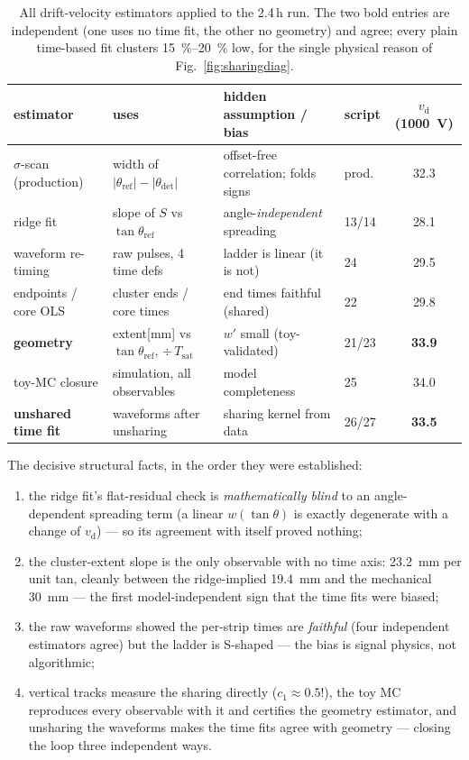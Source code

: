\documentclass[11pt,a4paper]{article}
\newcommand{\vd}{v_{\mathrm{d}}}
\newcommand{\thref}{\theta_{\mathrm{ref}}}
\newcommand{\thdet}{\theta_{\mathrm{det}}}
\newcommand{\Tsat}{T_{\mathrm{sat}}}
\begin{document}
\begin{table}[H]
\centering\footnotesize
\setlength{\tabcolsep}{4pt}%
\begin{tabular}{llllS[table-format=2.1]}
\toprule
estimator & uses & hidden assumption / bias & script &
{$\vd$(\SI{1000}{V})} \\
\midrule
$\sigma$-scan (production) & width of $|\thref|{-}|\thdet|$ &
  offset-free correlation; folds signs & prod. & 32.3 \\
ridge fit & slope of $S$ vs $\tan\thref$ &
  angle-\emph{independent} spreading & 13/14 & 28.1 \\
waveform re-timing & raw pulses, 4 time defs &
  ladder is linear (it is not) & 24 & 29.5 \\
endpoints / core OLS & cluster ends / core times &
  end times faithful (shared) & 22 & 29.8 \\
\textbf{geometry} & extent[mm] vs $\tan\thref$, $\div\,\Tsat$ &
  $w'$ small (toy-validated) & 21/23 & \bfseries 33.9 \\
toy-MC closure & simulation, all observables &
  model completeness & 25 & 34.0 \\
\textbf{unshared time fit} & waveforms after unsharing &
  sharing kernel from data & 26/27 & \bfseries 33.5 \\
\bottomrule
\end{tabular}
\caption{All drift-velocity estimators applied to the 2.4\,h run.  The two
bold entries are independent (one uses no time fit, the other no geometry)
and agree; every plain time-based fit clusters \SIrange{15}{20}{\percent}
low, for the single physical reason of Fig.~\ref{fig:sharingdiag}.}
\label{tab:estimators}
\end{table}

The decisive structural facts, in the order they were established:
\begin{enumerate}
  \item the ridge fit's flat-residual check is \emph{mathematically blind}
        to an angle-dependent spreading term (a linear $w(\tan\theta)$ is
        exactly degenerate with a change of $\vd$) --- so its agreement
        with itself proved nothing;
  \item the cluster-extent slope is the only observable with no time axis:
        \SI{23.2}{mm} per unit tan, cleanly between the ridge-implied
        \SI{19.4}{mm} and the mechanical \SI{30}{mm} --- the first
        model-independent sign that the time fits were biased;
  \item the raw waveforms showed the per-strip times are \emph{faithful}
        (four independent estimators agree) but the ladder is S-shaped ---
        the bias is signal physics, not algorithmic;
  \item vertical tracks measure the sharing directly
        ($c_1\approx0.5$!), the toy MC reproduces every observable with it
        and certifies the geometry estimator, and unsharing the waveforms
        makes the time fits agree with geometry --- closing the loop three
        independent ways.
\end{enumerate}
\end{document}
